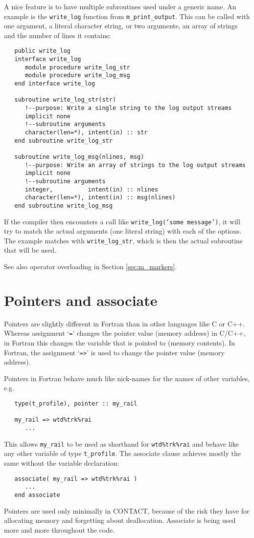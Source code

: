 \documentclass[12pt]{report}
\begin{document}
A nice feature is to have multiple subroutines used under a generic name.
An example is the {\tt write\_log} function from {\tt m\_print\_output}.
This can be called with one argument, a literal character string, or two
arguments, an array of strings and the number of lines it contains:
{\small\begin{verbatim}
   public write_log
   interface write_log
      module procedure write_log_str
      module procedure write_log_msg
   end interface write_log

   subroutine write_log_str(str)
      !--purpose: Write a single string to the log output streams
      implicit none
      !--subroutine arguments
      character(len=*), intent(in) :: str
   end subroutine write_log_str

   subroutine write_log_msg(nlines, msg)
      !--purpose: Write an array of strings to the log output streams
      implicit none
      !--subroutine arguments
      integer,          intent(in) :: nlines
      character(len=*), intent(in) :: msg(nlines)
   end subroutine write_log_msg
\end{verbatim}}
If the compiler then encounters a call like {\tt write\_log('some
message')}, it will try to match the actual arguments (one literal string)
with each of the options. The example matches with {\tt write\_\-log\_\-str},
which is then the actual subroutine that will be used.

See also operator overloading in Section \ref{sec:m_markers}.

\section{Pointers and associate}

Pointers are slightly different in Fortran than in other languages like C
or C++. Whereas assignment `{\tt =}' changes the pointer value (memory
address) in C/C++, in Fortran this changes the variable that is pointed to
(memory contents). In Fortran, the assignment `{\tt =>}' is used to change
the pointer value (memory address).

Pointers in Fortran behave much like nick-names for the names of other
variables, e.g.\
{\small\begin{verbatim}
   type(t_profile), pointer :: my_rail

   my_rail => wtd%trk%rai
      ...
\end{verbatim}}
This allows {\tt my\_rail} to be used as shorthand for {\tt wtd\%trk\%rai}
and behave like any other variable of type {\tt t\_profile}. The associate
clause achieves mostly the same without the variable declaration:
{\small\begin{verbatim}
   associate( my_rail => wtd%trk%rai )
      ...
   end associate
\end{verbatim}}
Pointers are used only minimally in CONTACT, because of the risk they have
for allocating memory and forgetting about deallocation. Associate is being
used more and more throughout the code.
\end{document}

